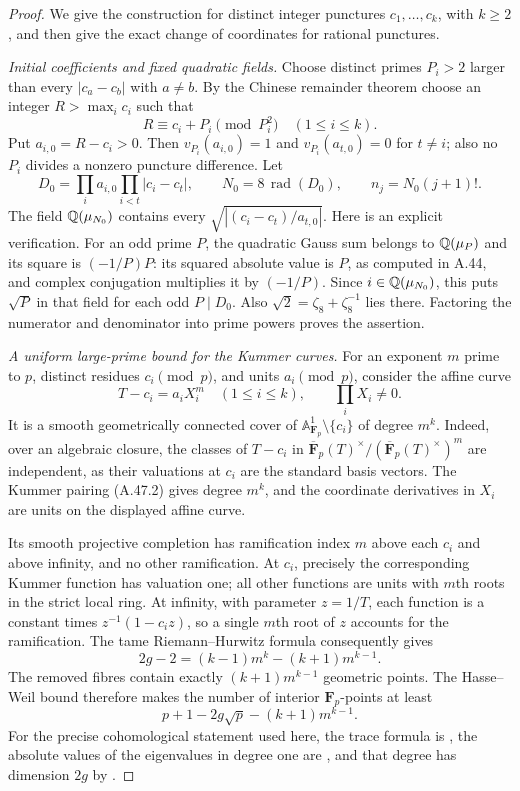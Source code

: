 \begin{proof}
We give the construction for distinct integer
punctures $c_1,\ldots,c_k$, with $k\ge2$, and then
give the exact change of coordinates for rational
punctures.

\emph{Initial coefficients and fixed quadratic fields.}
Choose distinct primes $P_i>2$ larger than every
$|c_a-c_b|$ with $a\ne b$. By the Chinese remainder
theorem choose an integer $R>\max_i c_i$ such that
\[
                R\equiv c_i+P_i\pmod {P_i^2}
                  \quad(1\le i\le k).
 \tag{A.48.2}
\]
Put $a_{i,0}=R-c_i>0$. Then
$v_{P_i}(a_{i,0})=1$ and
$v_{P_i}(a_{t,0})=0$ for $t\ne i$; also no $P_i$
divides a nonzero puncture difference.
Let
\[
 D_0=\prod_i a_{i,0}
             \prod_{i<t}|c_i-c_t|,\qquad
 N_0=8\,\operatorname{rad}(D_0),\qquad
 n_j=N_0(j+1)!.
 \tag{A.48.3}
\]
The field $\mathbb Q(\mu_{N_0})$ contains every
$\sqrt{|(c_i-c_t)/a_{t,0}|}$. Here is an explicit
verification. For an odd prime $P$, the quadratic
Gauss sum belongs to $\mathbb Q(\mu_P)$ and its square
is $(-1/P)P$: its squared absolute value is $P$,
as computed in A.44, and complex conjugation
multiplies it by $(-1/P)$. Since $i\in\mathbb Q(\mu_{N_0})$,
this puts $\sqrt P$ in that field for each odd
$P\mid D_0$. Also
$\sqrt2=\zeta_8+\zeta_8^{-1}$ lies there.
Factoring the numerator and denominator into prime
powers proves the assertion.

\emph{A uniform large-prime bound for the Kummer curves.}
For an exponent $m$ prime to $p$, distinct residues
$c_i\pmod p$, and units $a_i\pmod p$, consider the
affine curve
\[
          T-c_i=a_iX_i^m\quad(1\le i\le k),
          \qquad \prod_i X_i\ne0.
 \tag{A.48.4}
\]
It is a smooth geometrically connected cover of
$\mathbb A^1_{\mathbf F_p}\setminus\{c_i\}$ of
degree $m^k$. Indeed, over an algebraic closure,
the classes of $T-c_i$ in
$\overline{\mathbf F}_p(T)^\times/
       (\overline{\mathbf F}_p(T)^\times)^m$
are independent, as their valuations at $c_i$
are the standard basis vectors. The Kummer
pairing (A.47.2) gives degree $m^k$, and the
coordinate derivatives in $X_i$ are units on
the displayed affine curve.

Its smooth projective completion has ramification
index $m$ above each $c_i$ and above infinity,
and no other ramification. At $c_i$, precisely
the corresponding Kummer function has valuation
one; all other functions are units with $m$th
roots in the strict local ring. At infinity,
with parameter $z=1/T$, each function is a
constant times $z^{-1}(1-c_i z)$, so a single
$m$th root of $z$ accounts for the ramification.
The tame Riemann--Hurwitz formula consequently gives
\[
 2g-2=(k-1)m^k-(k+1)m^{k-1}.
 \tag{A.48.5}
\]
The removed fibres contain exactly
$(k+1)m^{k-1}$ geometric points.
The Hasse--Weil bound therefore makes the number
of interior $\mathbf F_p$-points at least
\[
 p+1-2g\sqrt p-(k+1)m^{k-1}.
 \tag{A.48.6}
\]
For the precise cohomological statement used here,
the trace formula is \cite[(1.5.1)]{AgentDeligneWeilI},
the absolute values of the eigenvalues in degree
one are \cite[Theorem (1.6)]{AgentDeligneWeilI},
and that degree has dimension $2g$ by
\cite[Proposition 14.2]{AgentMilneLEC}.


\end{proof}
